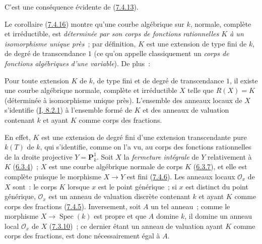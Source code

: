 C'est une conséquence évidente de (\hyperref[II.7.4.13-fr]{7.4.13}).

\begin{env}[7.4.17]
\label{II.7.4.17-fr}
Le corollaire (\hyperref[II.7.4.16-fr]{7.4.16}) montre qu'une courbe algébrique
sur $k$, normale, complète et irréductible, est \emph{déterminée par son corps
de fonctions rationnelles $K$ à un isomorphisme unique près}~; par définition,
$K$ est une extension de type fini de $k$, de degré de transcendance $1$ (ce
qu'on appelle classiquement un \emph{corps de fonctions algébriques d'une
variable}). De plus~:
\end{env}

\begin{proposition}[7.4.18]
\label{II.7.4.18-fr}
Pour toute extension $K$ de $k$, de type fini et de degré de transcendance
$1$, il existe une courbe algébrique normale, complète et irréductible $X$
telle que $R(X)=K$ (déterminée à isomorphisme unique près). L'ensemble des
anneaux locaux de $X$ s'identifie (\hyperref[I.8.2.1-fr]{I, 8.2.1}) à
l'ensemble formé de $K$ et des anneaux de valuation contenant $k$ et ayant
$K$ comme corps des fractions.
\end{proposition}

En effet, $K$ est une extension de degré fini d'une extension transcendante
pure $k(T)$ de $k$, qui s'identifie, comme on l'a vu, au corps des fonctions
rationnelles de la droite projective $Y=\mathbf{P}_k^1$. Soit $X$ la
\emph{fermeture intégrale} de $Y$ relativement à $K$
(\hyperref[II.6.3.4-fr]{6.3.4})~; $X$ est une courbe algébrique normale de
corps $K$ (\hyperref[II.6.3.7-fr]{6.3.7}), et elle est complète puisque le
morphisme $X\to Y$ est fini (\hyperref[II.7.4.6-fr]{7.4.6}). Les anneaux
locaux $\mathcal{O}_x$ de $X$ sont~: le corps $K$ lorsque $x$ est le point
générique~; si $x$ est distinct du point générique, $\mathcal{O}_x$ est un
anneau de valuation discrète contenant $k$ et ayant $K$ comme corps des
fractions (\hyperref[II.7.4.5-fr]{7.4.5}). Inversement, soit $A$ un tel
anneau~; comme le morphisme $X\to\operatorname{Spec}(k)$ est propre et que
$A$ domine $k$, il domine un anneau local $\mathcal{O}_x$ de $X$
(\hyperref[II.7.3.10-fr]{7.3.10})~; ce dernier étant un anneau de valuation
ayant $K$ comme corps des fractions, est donc nécessairement égal à $A$.

